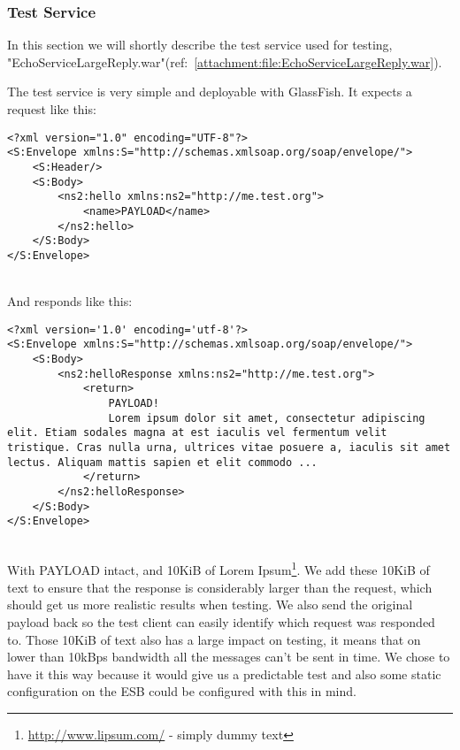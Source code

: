 \subsubsection{Test Service}\label{Testing:About:Service}
    In this section we will shortly describe the test service used for testing, "EchoServiceLargeReply.war"(ref:~\ref{attachment:file:EchoServiceLargeReply.war}).

    The test service is very simple and deployable with GlassFish. It expects a request like this:
    \lstset{language=XML, style=eclipse}
    \begin{lstlisting}
<?xml version="1.0" encoding="UTF-8"?>
<S:Envelope xmlns:S="http://schemas.xmlsoap.org/soap/envelope/">
    <S:Header/>
    <S:Body>
        <ns2:hello xmlns:ns2="http://me.test.org">
            <name>PAYLOAD</name>
        </ns2:hello>
    </S:Body>
</S:Envelope>
    \end{lstlisting}
    \\
    And responds like this:
    \begin{lstlisting}
<?xml version='1.0' encoding='utf-8'?>
<S:Envelope xmlns:S="http://schemas.xmlsoap.org/soap/envelope/">
    <S:Body>
        <ns2:helloResponse xmlns:ns2="http://me.test.org">
            <return>
                PAYLOAD!
                Lorem ipsum dolor sit amet, consectetur adipiscing elit. Etiam sodales magna at est iaculis vel fermentum velit tristique. Cras nulla urna, ultrices vitae posuere a, iaculis sit amet lectus. Aliquam mattis sapien et elit commodo ...
            </return>
        </ns2:helloResponse>
    </S:Body>
</S:Envelope>
    \end{lstlisting}
    \\
    With PAYLOAD intact, and 10KiB of Lorem Ipsum\footnote{\url{http://www.lipsum.com/} - simply dummy text}. We add these 10KiB of text to ensure that the response is considerably larger than the request, which should get us more realistic results when testing. We also send the original payload back so the test client can easily identify which request was responded to. Those 10KiB of text also has a large impact on testing, it means that on lower than 10kBps bandwidth all the messages can't be sent in time. We chose to have it this way because it would give us a predictable test and also some static configuration on the ESB could be configured with this in mind.

